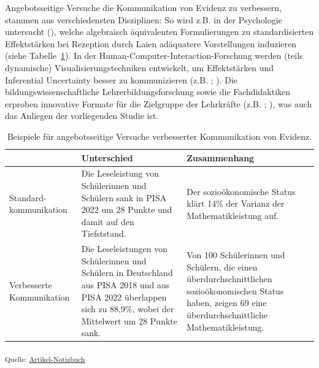 \documentclass[
  man,
  floatsintext,
  longtable,
  nolmodern,
  notxfonts,
  notimes,
  colorlinks=true,linkcolor=blue,citecolor=blue,urlcolor=blue]{apa7}
\begin{document}
Angebotsseitige Versuche die Kommunikation von Evidenz zu verbessern,
stammen aus verschiedensten Disziplinen: So wird z.B. in der Psychologie
untersucht (), welche
algebraisch äquivalenten Formulierungen zu standardisierten
Effektstärken bei Rezeption durch Laien adäquatere Vorstellungen
induzieren (siehe Tabelle~\ref{tbl-wisskommbsp}). In der
Human-Computer-Interaction-Forschung werden (teils dynamische)
Visualisierungstechniken entwickelt, um Effektstärken und Inferential
Uncertainty besser zu kommunizieren (z.B.
;
). Die
bildungswissenschaftliche Lehrerbildungsforschung sowie die
Fachdidaktiken erproben innovative Formate für die Zielgruppe der
Lehrkräfte (z.B. ; ), was auch das Anliegen der vorliegenden Studie ist.

\begin{table}

{\caption{{Beispiele für angebotsseitige Versuche verbesserter
Kommunikation von Evidenz.}{\label{tbl-wisskommbsp}}}
\vspace{-20pt}}

\fontsize{9.0pt}{11.0pt}\selectfont
\begin{tabular*}{\linewidth}{@{\extracolsep{\fill}}lll}
\toprule
 & Unterschied & Zusammenhang \\ 
\midrule\addlinespace[2.5pt]
Standard-kommunikation & Die Leseleistung von Schülerinnen und Schülern sank in PISA 2022 um 28 Punkte und damit auf den Tiefststand. & Der sozioökonomische Status klärt 14\% der Varianz der Mathematikleistung auf. \\ 
Verbesserte Kommunikation & Die Leseleistungen von Schülerinnen und Schülern in Deutschland aus PISA 2018 und aus PISA 2022 überlappen sich zu 88,9\%, wobei der Mittelwert um 28 Punkte sank. & Von 100 Schülerinnen und Schülern, die einen überdurchschnittlichen sozioökonomischen Status haben, zeigen 69 eine überdurchschnittliche Mathematikleistung. \\ 
\bottomrule
\end{tabular*}

\end{table}

\textsubscript{Quelle:
\href{https://sammerk.github.io/StudienergebnisseBesserKommunizieren/index.qmd.html}{Artikel-Notizbuch}}
\end{document}
